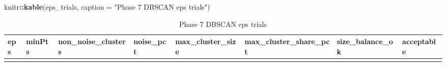 \documentclass[
]{article}
\newenvironment{Shaded}{\begin{snugshade}}{\end{snugshade}}
\newcommand{\AttributeTok}[1]{\textcolor[rgb]{0.13,0.29,0.53}{#1}}
\newcommand{\FunctionTok}[1]{\textcolor[rgb]{0.13,0.29,0.53}{\textbf{#1}}}
\newcommand{\NormalTok}[1]{#1}
\newcommand{\SpecialCharTok}[1]{\textcolor[rgb]{0.81,0.36,0.00}{\textbf{#1}}}
\newcommand{\StringTok}[1]{\textcolor[rgb]{0.31,0.60,0.02}{#1}}
\begin{document}
\begin{Shaded}
\begin{Highlighting}[]
\NormalTok{knitr}\SpecialCharTok{::}\FunctionTok{kable}\NormalTok{(eps\_trials, }\AttributeTok{caption =} \StringTok{"Phase 7 DBSCAN eps trials"}\NormalTok{)}
\end{Highlighting}
\end{Shaded}

\begin{longtable}[]{@{}
  >{\raggedleft\arraybackslash}p{}
  >{\raggedleft\arraybackslash}p{}
  >{\raggedleft\arraybackslash}p{}
  >{\raggedleft\arraybackslash}p{}
  >{\raggedleft\arraybackslash}p{}
  >{\raggedleft\arraybackslash}p{}
  >{\raggedright\arraybackslash}p{}
  >{\raggedright\arraybackslash}p{}@{}}
\caption{Phase 7 DBSCAN eps trials}\tabularnewline
\toprule\noalign{}
\begin{minipage}[b]{\linewidth}\raggedleft
eps
\end{minipage} & \begin{minipage}[b]{\linewidth}\raggedleft
minPts
\end{minipage} & \begin{minipage}[b]{\linewidth}\raggedleft
non\_noise\_clusters
\end{minipage} & \begin{minipage}[b]{\linewidth}\raggedleft
noise\_pct
\end{minipage} & \begin{minipage}[b]{\linewidth}\raggedleft
max\_cluster\_size
\end{minipage} & \begin{minipage}[b]{\linewidth}\raggedleft
max\_cluster\_share\_pct
\end{minipage} & \begin{minipage}[b]{\linewidth}\raggedright
size\_balance\_ok
\end{minipage} & \begin{minipage}[b]{\linewidth}\raggedright
acceptable
\end{minipage} \\
\midrule\noalign{}
\endfirsthead
\toprule\noalign{}
\begin{minipage}[b]{\linewidth}\raggedleft

\end{minipage}
\end{longtable}
\end{document}

